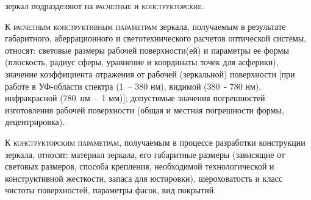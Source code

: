  зеркал подразделяют на \textsc{расчетные} и \textsc{конструкторские}.

К \textsc{расчетным конструктивным параметрам} зеркала, получаемым в результате габаритного, аберрационного и светотехнического расчетов оптической системы, относят: световые размеры рабочей поверхности(ей) и параметры ее формы (плоскость, радиус сферы, уравнение и координаты точек для асферики), значение коэффициента отражения от рабочей (зеркальной) поверхности [при работе в УФ-области спектра (1~-- 380 нм), видимой (380~- 780 нм), инфракрасной (780~нм~-- 1 мм)]; допустимые значения погрешностей изготовления рабочей поверхности (общая и местная погрешности формы, децентрировка).

К \textsc{конструкторским параметрам}, получаемым в процессе разработки конструкции зеркала, относят: материал зеркала, его габаритные размеры (зависящие от световых размеров, способа крепления, необходимой технологической и конструктивной жесткости, запаса для юстировки), шероховатость и класс чистоты поверхностей, параметры фасок, вид покрытий.

